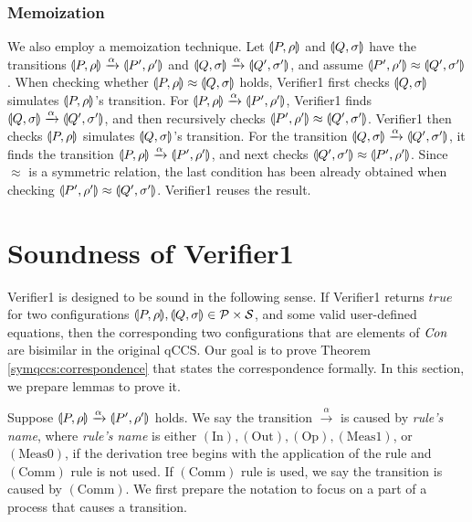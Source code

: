 \subsubsection{Memoization}
We also employ a memoization technique. Let $\llparenthesis P, \rho \rrparenthesis$ and
$\llparenthesis Q, \sigma \rrparenthesis$
have the transitions $\llparenthesis P, \rho \rrparenthesis \xrightarrow{\alpha} \llparenthesis P', \rho' \rrparenthesis$ and 
$\llparenthesis Q, \sigma \rrparenthesis \xrightarrow{\alpha} \llparenthesis Q', \sigma' \rrparenthesis$, and assume $\llparenthesis P', \rho' \rrparenthesis \approx \llparenthesis Q', \sigma' \rrparenthesis$.
When checking whether $\llparenthesis P, \rho \rrparenthesis \approx \llparenthesis Q, \sigma \rrparenthesis$ holds, Verifier1 
first checks $\llparenthesis Q, \sigma \rrparenthesis$ simulates $\llparenthesis P, \rho \rrparenthesis$'s transition. For $\llparenthesis P, \rho \rrparenthesis
\xrightarrow{\alpha} \llparenthesis P', \rho' \rrparenthesis$, Verifier1 finds $\llparenthesis Q, \sigma \rrparenthesis \xrightarrow{\alpha}
\llparenthesis Q', \sigma' \rrparenthesis$, and then recursively checks $\llparenthesis P', \rho' \rrparenthesis \approx \llparenthesis Q', \sigma' \rrparenthesis$.
Verifier1 then checks $\llparenthesis P, \rho \rrparenthesis$ simulates $\llparenthesis Q, \sigma \rrparenthesis$'s transition. For the transition $\llparenthesis Q, \sigma \rrparenthesis \xrightarrow{\alpha} \llparenthesis Q', \sigma' \rrparenthesis$, it finds
the transition $\llparenthesis P, \rho \rrparenthesis \xrightarrow{\alpha} \llparenthesis P', \rho' \rrparenthesis$, and next
checks $\llparenthesis Q', \sigma' \rrparenthesis \approx \llparenthesis P', \rho' \rrparenthesis$. Since $\approx$ is a 
symmetric relation, the last condition has been
already obtained when checking $\llparenthesis P', \rho' \rrparenthesis \approx
\llparenthesis Q', \sigma' \rrparenthesis$.
Verifier1 reuses the result.

\section{Soundness of Verifier1}
\label{symqccs:sndness}
Verifier1 is designed to be sound in the following sense.
If Verifier1 returns $\mathit{true}$ for two configurations
$\llparenthesis P, \rho \rrparenthesis,
\llparenthesis Q, \sigma \rrparenthesis \in \mathcal{P} \times \mathcal{S}$,
and some valid user-defined equations, then
the corresponding two configurations that are elements of $\mathit{Con}$
are bisimilar in the original qCCS. Our goal is to prove Theorem
 \ref{symqccs:correspondence} that states the correspondence formally.
In this section, we prepare lemmas to prove it.

Suppose $\llparenthesis P, \rho \rrparenthesis \xrightarrow{\alpha} \llparenthesis P', \rho' \rrparenthesis$ holds. 
We say the transition $\xrightarrow{\alpha}$ is caused by {\it rule's
name}, where {\it rule's name} is either $\mathrm{(In)},
\mathrm{(Out)}, \mathrm{(Op)}, \mathrm{(Meas1)}$, or
$\mathrm{(Meas0)}$, if the derivation tree begins with the application
of the rule and
$\mathrm{(Comm)}$ rule is not used. If $\mathrm{(Comm)}$ rule is used,
we say the transition is caused by $\mathrm{(Comm)}$.
We first prepare the notation to focus on a part of a process that causes
a transition.

